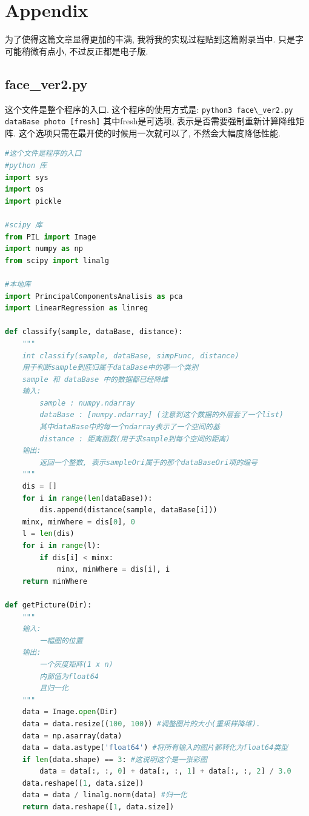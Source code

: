\documentclass[fleqn,10pt]{SelfArx} %
\begin{document}
\section*{Appendix}
为了使得这篇文章显得更加的丰满, 我将我的实现过程贴到这篇附录当中.
只是字可能稍微有点小, 不过反正都是电子版.

\setmainfont{Monaco} %
\subsection*{face\_ver2.py}
这个文件是整个程序的入口.
这个程序的使用方式是:
\verb+python3 face\_ver2.py dataBase photo [fresh]+
其中fresh是可选项, 表示是否需要强制重新计算降维矩阵.
这个选项只需在最开使的时候用一次就可以了, 不然会大幅度降低性能.
\begin{lstlisting}[language=python]
#这个文件是程序的入口
#python 库
import sys
import os
import pickle

#scipy 库
from PIL import Image
import numpy as np
from scipy import linalg

#本地库
import PrincipalComponentsAnalisis as pca
import LinearRegression as linreg

def classify(sample, dataBase, distance):
    """
    int classify(sample, dataBase, simpFunc, distance)
    用于判断sample到底归属于dataBase中的哪一个类别
    sample 和 dataBase 中的数据都已经降维
    输入:
        sample : numpy.ndarray
        dataBase : [numpy.ndarray] (注意到这个数据的外层套了一个list)
        其中dataBase中的每一个ndarray表示了一个空间的基
        distance : 距离函数(用于求sample到每个空间的距离)
    输出:
        返回一个整数, 表示sampleOri属于的那个dataBaseOri项的编号
    """
    dis = []
    for i in range(len(dataBase)):
        dis.append(distance(sample, dataBase[i]))
    minx, minWhere = dis[0], 0 
    l = len(dis)
    for i in range(l):
        if dis[i] < minx:
            minx, minWhere = dis[i], i
    return minWhere

def getPicture(Dir):
    """
    输入:
        一幅图的位置
    输出:
        一个灰度矩阵(1 x n)
        内部值为float64
        且归一化
    """
    data = Image.open(Dir)
    data = data.resize((100, 100)) #调整图片的大小(重采样降维).
    data = np.asarray(data)
    data = data.astype('float64') #将所有输入的图片都转化为float64类型
    if len(data.shape) == 3: #这说明这个是一张彩图
        data = data[:, :, 0] + data[:, :, 1] + data[:, :, 2] / 3.0
    data.reshape([1, data.size])
    data = data / linalg.norm(data) #归一化
    return data.reshape([1, data.size])


\end{lstlisting}
\end{document}
